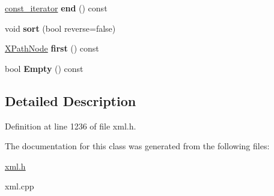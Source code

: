 \begin{DoxyCompactItemize}
\item 
\hypertarget{classphys_1_1xml_1_1XPathNodeSet_adc1ab904e2122928837cc02f1b0a54bf}{
\hyperlink{classphys_1_1xml_1_1XPathNode}{const\_\-iterator} {\bfseries end} () const }
\label{de/dc2/classphys_1_1xml_1_1XPathNodeSet_adc1ab904e2122928837cc02f1b0a54bf}

\item 
\hypertarget{classphys_1_1xml_1_1XPathNodeSet_ad18d6b92f885ee9d862f5008af734559}{
void {\bfseries sort} (bool reverse=false)}
\label{de/dc2/classphys_1_1xml_1_1XPathNodeSet_ad18d6b92f885ee9d862f5008af734559}

\item 
\hypertarget{classphys_1_1xml_1_1XPathNodeSet_a7d3c2d75f154b863a8e81d32e4662b78}{
\hyperlink{classphys_1_1xml_1_1XPathNode}{XPathNode} {\bfseries first} () const }
\label{de/dc2/classphys_1_1xml_1_1XPathNodeSet_a7d3c2d75f154b863a8e81d32e4662b78}

\item 
\hypertarget{classphys_1_1xml_1_1XPathNodeSet_a77e87e2a776cf28501d284532f60e74a}{
bool {\bfseries Empty} () const }
\label{de/dc2/classphys_1_1xml_1_1XPathNodeSet_a77e87e2a776cf28501d284532f60e74a}

\end{DoxyCompactItemize}


\subsection{Detailed Description}


Definition at line 1236 of file xml.h.



The documentation for this class was generated from the following files:\begin{DoxyCompactItemize}
\item 
\hyperlink{xml_8h}{xml.h}\item 
xml.cpp\end{DoxyCompactItemize}
